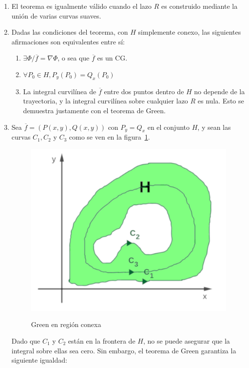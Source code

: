 \documentclass{article}
\begin{document}
\begin{enumerate}
\item El teorema es igualmente válido cuando el lazo $R$ es construido mediante la unión de varias curvas suaves.

\item Dadas las condiciones del teorema, con $H$ simplemente conexo, las siguientes afirmaciones son equivalentes entre sí:
\begin{enumerate}
\item $\exists \Phi / \overline{f} = \nabla \Phi$, o sea que $\overline{f}$ es un CG.
\item $\forall P_0 \in H, P_y(P_0) = Q_x(P_0)$
\item La integral curvilínea de $\overline{f}$ entre dos puntos dentro de $H$ no depende de la trayectoria, y la integral curvilínea sobre cualquier lazo $R$ es nula. Esto se demuestra justamente con el teorema de Green.
\end{enumerate}

\item Sea $\overline{f} = (P(x,y), Q(x,y))$ con $P_y = Q_x$ en el conjunto $H$, y sean las curvas $C_1, C_2$ y $C_3$ como se ven en la figura~\ref{fig:greenrc}.

\begin{figure}[ht]
\centering
\caption{Green en región conexa}
\includegraphics[scale=0.85]{img/teoremas/green_region_conexa.png}
\label{fig:greenrc}
\end{figure}

Dado que $C_1$ y $C_2$ están en la frontera de $H$, no se puede asegurar que la integral sobre ellas sea cero. Sin embargo, el teorema de Green garantiza la siguiente igualdad:


\end{enumerate}
\end{document}
